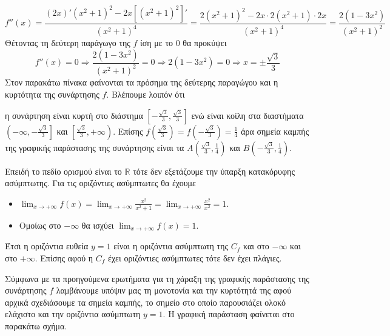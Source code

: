 \documentclass[internet]{diag-pan-xelatex}
\begin{document}
\begin{thema}
\begin{erwthma}
\[ f''(x)=\frac{\left(2x\right)'\left( x^2+1\right)^2-2x\left[ \left( x^2+1\right)^2\right] ' }{\left( x^2+1\right)^4}=\frac{2\left( x^2+1\right)^2-2x\cdot2\left( x^2+1\right)\cdot2x }{\left( x^2+1\right)^4}=\frac{2\left(1-3x^2\right) }{\left( x^2+1\right)^2}\]
Θέτοντας τη δεύτερη παράγωγο της $ f $ ίση με το $ 0 $ θα προκύψει
\[ f''(x)=0\Rightarrow\frac{2\left(1-3x^2\right) }{\left( x^2+1\right)^2}=0\Rightarrow 2\left(1-3x^2\right) =0\Rightarrow x=\pm\frac{\sqrt{3}}{3} \]
Στον παρακάτω πίνακα φαίνονται τα πρόσημα της δεύτερης παραγώγου και η κυρτότητα της συνάρτησης $ f $. Βλέπουμε λοιπόν ότι
\begin{center}
\end{center}
η συνάρτηση είναι κυρτή στο διάστημα $ \left[-\frac{\sqrt{3}}{3},\frac{\sqrt{3}}{3}\right]  $ ενώ είναι κοίλη στα διαστήματα $ \left(-\infty,-\frac{\sqrt{3}}{3} \right]  $ και $ \left[\frac{\sqrt{3}}{3},+\infty \right)  $. Επίσης $ f\left( \frac{\sqrt{3}}{3}\right)=f\left( -\frac{\sqrt{3}}{3}\right)=\frac{1}{4} $ άρα σημεία καμπής της γραφικής παράστασης της συνάρτησης είναι τα $ A\left( \frac{\sqrt{3}}{3},\frac{1}{4} \right)  $ και $ B\left( -\frac{\sqrt{3}}{3},\frac{1}{4} \right)  $.\\
\item Επειδή το πεδίο ορισμού είναι το $ \mathbb{R} $ τότε δεν εξετάζουμε την ύπαρξη κατακόρυφης ασύμπτωτης. Για τις οριζόντιες ασύμπτωτες θα έχουμε
\begin{itemize}
\item $ \displaystyle{\lim_{x\to+\infty}{f(x)}=\lim_{x\to+\infty}{\frac{x^2}{x^2+1}}=\lim_{x\to+\infty}{\frac{x^2}{x^2}}=1} $.
\item Ομοίως στο $ -\infty $ θα ισχύει $ \displaystyle{\lim_{x\to+\infty}{f(x)}=1} $.
\end{itemize}
Έτσι η οριζόντια ευθεία $ y=1 $ είναι η οριζόντια ασύμπτωτη της $ C_f $ και στο $ -\infty $ και στο $ +\infty $. Επίσης αφού η $ C_f $ έχει οριζόντιες ασύμπτωτες τότε δεν έχει πλάγιες.\\
\item Σύμφωνα με τα προηγούμενα ερωτήματα για τη χάραξη της γραφικής παράστασης της συνάρτησης $ f $ λαμβάνουμε υπόψιν μας τη μονοτονία και την κυρτότητά της αφού αρχικά σχεδιάσουμε τα σημεία καμπής, το σημείο στο οποίο παρουσιάζει ολοκό ελάχιστο και την οριζόντια ασύμπτωτη $ y=1 $. Η γραφική παράσταση φαίνεται στο παρακάτω σχήμα.

\end{erwthma}
\end{thema}
\end{document}
